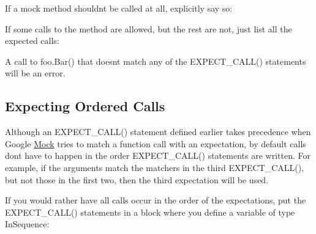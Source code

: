If a mock method shouldn\textquotesingle{}t be called at all, explicitly say so\+:


\begin{DoxyCode}{0}
\end{DoxyCode}


If some calls to the method are allowed, but the rest are not, just list all the expected calls\+:


\begin{DoxyCode}{0}
\end{DoxyCode}


A call to {\ttfamily foo.\+Bar()} that doesn\textquotesingle{}t match any of the {\ttfamily E\+X\+P\+E\+C\+T\+\_\+\+C\+A\+L\+L()} statements will be an error.

\subsection*{Expecting Ordered Calls}

Although an {\ttfamily E\+X\+P\+E\+C\+T\+\_\+\+C\+A\+L\+L()} statement defined earlier takes precedence when Google \mbox{\hyperlink{class_mock}{Mock}} tries to match a function call with an expectation, by default calls don\textquotesingle{}t have to happen in the order {\ttfamily E\+X\+P\+E\+C\+T\+\_\+\+C\+A\+L\+L()} statements are written. For example, if the arguments match the matchers in the third {\ttfamily E\+X\+P\+E\+C\+T\+\_\+\+C\+A\+L\+L()}, but not those in the first two, then the third expectation will be used.

If you would rather have all calls occur in the order of the expectations, put the {\ttfamily E\+X\+P\+E\+C\+T\+\_\+\+C\+A\+L\+L()} statements in a block where you define a variable of type {\ttfamily In\+Sequence}\+:


\begin{DoxyCode}{0}
\DoxyCodeLine{}
\DoxyCodeLine{\{}
\DoxyCodeLine{}
\DoxyCodeLine{\}}
\end{DoxyCode}


